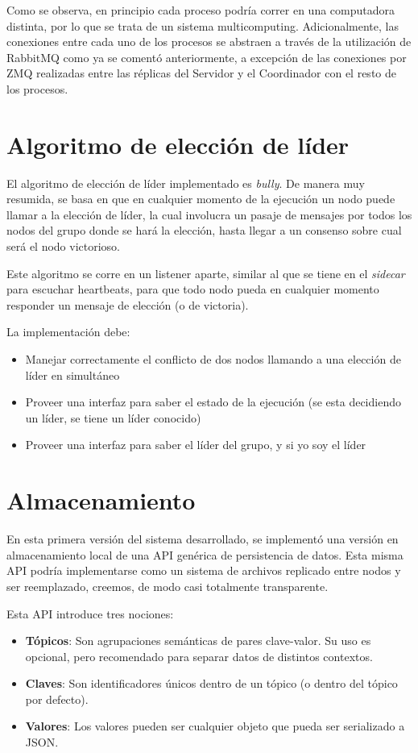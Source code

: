\documentclass[titlepage,a4paper,oneside]{article}
\begin{document}
Como se observa, en principio cada proceso podría correr en una computadora distinta, por lo que se trata de un sistema multicomputing. Adicionalmente, las conexiones entre cada uno de los procesos se abstraen a través de la utilización de RabbitMQ como ya se comentó anteriormente, a excepción de las conexiones por ZMQ realizadas entre las réplicas del Servidor y el Coordinador con el resto de los procesos.


\section{Algoritmo de elección de líder}

El algoritmo de elección de líder implementado es \textit{bully}. De manera muy resumida, se basa en que en cualquier momento de la ejecución un nodo puede llamar a la elección de líder, la cual involucra un pasaje de mensajes por todos los nodos del grupo donde se hará la elección, hasta llegar a un consenso sobre cual será el nodo victorioso.

Este algoritmo se corre en un listener aparte, similar al que se tiene en el \textit{sidecar} para escuchar heartbeats, para que todo nodo pueda en cualquier momento responder un mensaje de elección (o de victoria).

La implementación debe:

\begin{itemize}
    \item Manejar correctamente el conflicto de dos nodos llamando a una elección de líder en simultáneo
    \item Proveer una interfaz para saber el estado de la ejecución (se esta decidiendo un líder, se tiene un líder conocido)
    \item Proveer una interfaz para saber el líder del grupo, y si yo soy el líder
\end{itemize}

\section{Almacenamiento}\label{APIStorage}
En esta primera versión del sistema desarrollado, se implementó una versión en almacenamiento local de una API genérica de persistencia de datos. Esta misma API podría implementarse como un sistema de archivos replicado entre nodos y ser reemplazado, creemos, de modo casi totalmente transparente.

Esta API introduce tres nociones:
\begin{itemize}
\item \textbf{Tópicos}: Son agrupaciones semánticas de pares clave-valor. Su uso es opcional, pero recomendado para separar datos de distintos contextos.
\item \textbf{Claves}: Son identificadores únicos dentro de un tópico (o dentro del tópico por defecto).
\item \textbf{Valores}: Los valores pueden ser cualquier objeto que pueda ser serializado a JSON.
\end{itemize}
\end{document}
